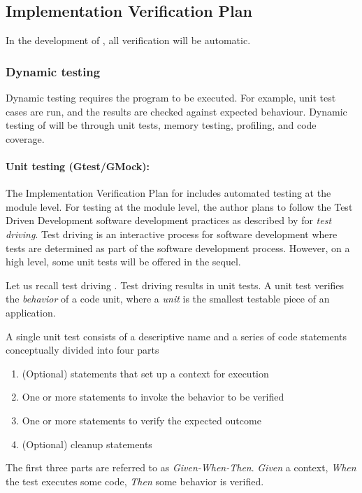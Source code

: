 \documentclass[12pt, titlepage]{article}
\begin{document}
\subsection{Implementation Verification Plan}

In the development of , all verification will be automatic.

\subsubsection{Dynamic testing}
Dynamic testing requires the program to be executed. For example, unit test cases
are run, and the results are checked against expected behaviour.
Dynamic testing of  will be through unit tests, memory testing, profiling,
and code coverage.

\paragraph{Unit testing (Gtest/GMock):}
The Implementation Verification Plan for  includes automated testing at the module level.
For testing at the module level, the author plans to follow the Test Driven Development
software development practices as described by \cite{langr2013} for {\it test driving}.
Test driving is an interactive process for software development where tests are determined
as part of the software development process. However, on a high level, some unit tests
will be offered in the sequel.

Let us recall test driving \cite{langr2013}.
Test driving results in unit tests. A unit test verifies the {\it behavior} of a code unit,
where a {\it unit} is the smallest testable piece of an application.

A single unit test consists of a descriptive name and a series of code statements conceptually
divided into four parts

\begin{enumerate}
  \item (Optional) statements that set up a context for execution
  \item One or more statements to invoke the behavior to be verified
  \item One or more statements to verify the expected outcome
  \item (Optional) cleanup statements
\end{enumerate}

The first three parts are referred to as {\it Given-When-Then}. {\it Given} a context, {\it When}
the test executes some code, {\it Then} some behavior is verified.
\end{document}

